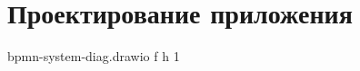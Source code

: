 \section{Проектирование приложения}


{bpmn-system-diag.drawio} %
{f} %
{h} %
{1\textwidth} %
{} %

%
%
%
%
%
%
%
%
